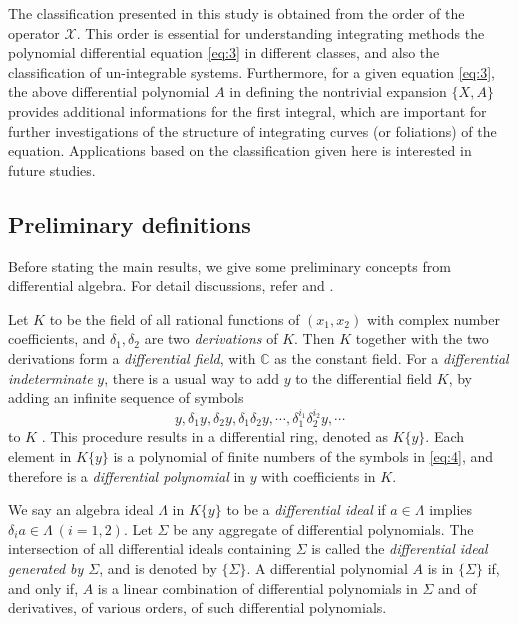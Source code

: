\documentclass[preprint,12pt]{elsarticle}
\begin{document}
The classification presented in this study is obtained from the order of the operator $\mathscr{X}$. This order is essential for understanding integrating methods the polynomial differential equation \eqref{eq:3} in different classes, and also the classification of un-integrable systems. Furthermore, for a given equation \eqref{eq:3}, the above differential polynomial $A$ in defining the nontrivial expansion $\{X,A\}$ provides additional informations for the first integral, which are important for further investigations of the structure of integrating curves (or foliations) of the equation.  Applications based on the classification given here is interested in future studies.

\subsection{Preliminary definitions}
Before stating the main results, we give some preliminary concepts from differential algebra. For detail discussions, refer\cite{Ka:76} and \cite{Ritt:50}.

Let $K$ to be the field of all rational functions of $(x_1, x_2)$ with complex number coefficients,  and $\delta_1, \delta_2$ are two \textit{derivations} of $K$.  Then $K$ together with the two derivations form a \textit{differential field}, with $\mathbb{C}$ as the constant field. For a \textit{differential indeterminate} $y$, there is a usual way to add $y$ to the differential field $K$, by adding an infinite sequence of symbols
\begin{equation}
\label{eq:4}
y, \delta_1y, \delta_2y,\delta_1\delta_2y,\cdots, \delta_1^{i_1}\delta_2^{i_2}y,\cdots
\end{equation}
to $K$ \cite{Ka:76}.  This procedure results in a differential ring, denoted as $K\{y\}$.  Each  element in $K\{y\}$ is a polynomial of finite numbers of the symbols in \eqref{eq:4}, and therefore is a \textit{differential polynomial} in $y$ with coefficients in $K$. 

We say an algebra ideal $\Lambda$ in $K\{y\}$ to be a \textit{differential ideal} if $a\in \Lambda$ implies $\delta_i a \in \Lambda\ (i=1,2)$.   Let $\Sigma$ be any aggregate of differential polynomials. The intersection of all differential ideals containing  $\Sigma$ is called the \textit{differential ideal generated by $\Sigma$}, and is denoted by $\{\Sigma\}$. A differential polynomial $A$ is in $\{\Sigma\}$ if, and only if, $A$ is a linear combination of differential polynomials in $\Sigma$ and of derivatives, of various orders, of such differential polynomials.
\end{document}
